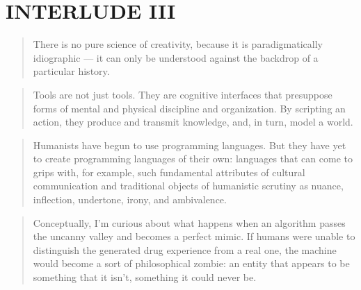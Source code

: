 
\pagestyle{empty}

\chapter*{INTERLUDE III}
\label{interlude3}



\begin{quotation}
  There is no pure science of creativity, because it is paradigmatically idiographic --- it can only be understood against the backdrop of a particular history.
\end{quotation}

\begin{quotation}
  Tools are not just tools. They are cognitive interfaces that presuppose forms of mental and physical discipline and organization. By scripting an action, they produce and transmit knowledge, and, in turn, model a world. 
\end{quotation}

\begin{quotation}
  Humanists have begun to use programming languages. But they have yet to create programming languages of their own: languages that can come to grips with, for example, such fundamental attributes of cultural communication and traditional objects of humanistic scrutiny as nuance, inflection, undertone, irony, and ambivalence. 
\end{quotation}

\begin{quotation}
  Conceptually, I'm curious about what happens when an algorithm passes the uncanny valley and becomes a perfect mimic. If humans were unable to distinguish the generated drug experience from a real one, the machine would become a sort of philosophical zombie: an entity that appears to be something that it isn't, something it could never be. 
\end{quotation}


\pagestyle{fania}


\clearpage